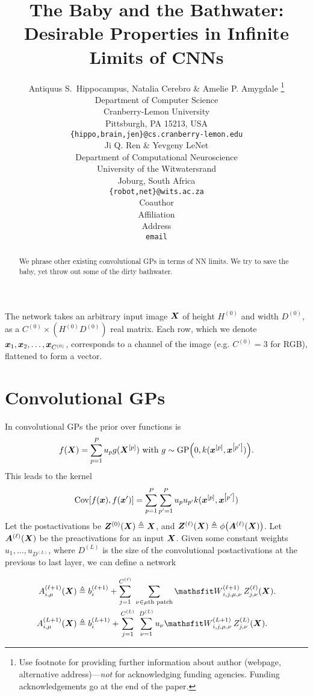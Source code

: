 \documentclass{article} %
\title{The Baby and the Bathwater: 
Desirable Properties in Infinite Limits of CNNs}
\author{Antiquus S.~Hippocampus, Natalia Cerebro \& Amelie P. Amygdale \thanks{ Use footnote for providing further information
about author (webpage, alternative address)---\emph{not} for acknowledging
funding agencies.  Funding acknowledgements go at the end of the paper.} \\
Department of Computer Science\\
Cranberry-Lemon University\\
Pittsburgh, PA 15213, USA \\
\texttt{\{hippo,brain,jen\}@cs.cranberry-lemon.edu} \\
\And
Ji Q. Ren \& Yevgeny LeNet \\
Department of Computational Neuroscience \\
University of the Witwatersrand \\
Joburg, South Africa \\
\texttt{\{robot,net\}@wits.ac.za} \\
\AND
Coauthor \\
Affiliation \\
Address \\
\texttt{email}
}
\newcommand{\bracket}[3]{{\left#1 #3 \right#2}}
\newcommand{\bra}{\bracket{(}{)}}
\newcommand{\sqb}{\bracket{[}{]}}
\newcommand{\ssup}[1]{^\bra{#1}}
\newcommand{\GP}[1]{{\text{GP}\bra{#1}}}
\newcommand{\eqdef}{\triangleq}
\newcommand{\patch}[1]{{{#1}\text{th patch}}}
\begin{document}
\maketitle

\begin{abstract}
  We phrase other existing convolutional GPs in terms of NN limits. We try to
  save the baby, yet throw out some of the dirty bathwater.
\end{abstract}

The network takes an arbitrary input image ${\bm{X}}$ of height $H\ssup{0}$ and
width $D\ssup{0}$, as a $C\ssup{0} \times (H\ssup{0}
D\ssup{0})$ real matrix. 
Each row, which we denote $\vx_1,\vx_2,\dotsc,\vx_{C\ssup{0}}$, corresponds to a channel
of the image (e.g. $C\ssup{0} = 3$ for RGB), flattened to form a 
vector.

\section{Convolutional GPs}

In convolutional GPs \cite{markvdw2017convolutional} the prior over functions is
\begin{equation}
  f(\mX) = \sum_{p=1}^P u_p g(\mX^\sqb{p}) \text{ with } g \sim \GP{0, k(\vx^\sqb{p}, \vx^\sqb{p'})}.
\end{equation}
This leads to the kernel 
\begin{equation}
\Cov\sqb{f(\vx), f(\vx')} = \sum_{p=1}^P\sum_{p'=1}^P u_p u_{p'} k(\vx^\sqb{p}, \vx^\sqb{p'})
\end{equation}
Let the postactivations be $\mZ\ssup{0}(\mX) \eqdef \mX$, and
$\mZ\ssup{\ell}(\mX) \eqdef \phi\bra{\mA\ssup{\ell}(\mX)}$. Let
$\mA\ssup{\ell}(\mX)$ be the preactivations for an input ${\bm{X}}$. Given some
constant weights ${u_1, \dots, u_{D\ssup{L}}}$, where $D\ssup{L}$ is the size of
the convolutional postactivations at the previous to last layer, we can define a
network

\begin{align}
  \emA_{i,\mu}\ssup{\ell+1}(\mX) &\eqdef \evb_i\ssup{\ell+1} +
  \sum_{j=1}^{C\ssup{\ell}} \ \sum_{\nu\in\patch{\mu}} \etW\ssup{\ell+1}_{i,j,\mu,\nu}\, \emZ\ssup{\ell}_{j,\nu}(\mX).
  \label{eq:convgp-network-recursive} \\
  \emA_{i,\mu}\ssup{L+1}(\mX) &\eqdef \evb_i\ssup{L+1} +
                                   \sum_{j=1}^{C\ssup{L}} \ \sum_{\nu=1}^{D\ssup{L}} u_\nu \etW\ssup{L+1}_{i,j,\mu,\nu}\, \emZ\ssup{L}_{j,\nu}(\mX).
                                   \label{eq:convgp-network-final}
\end{align}
\end{document}

